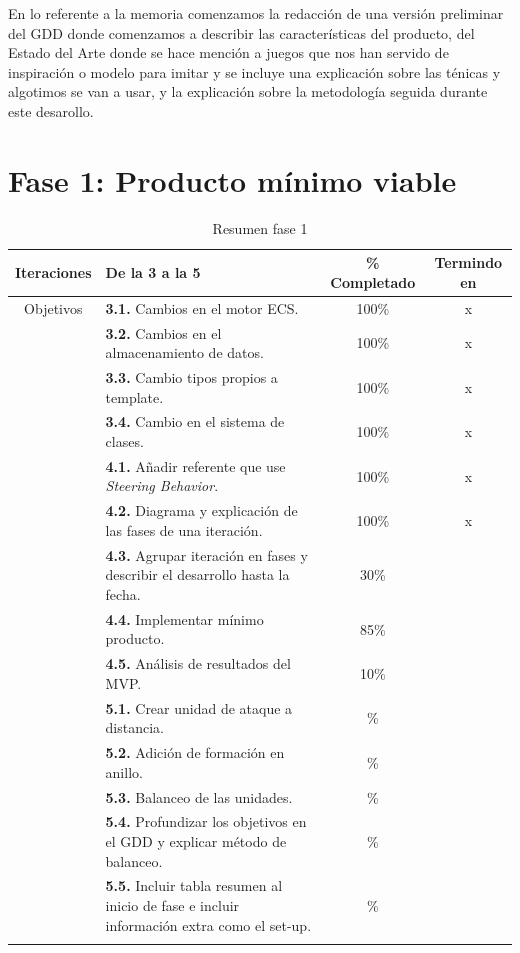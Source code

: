 En lo referente a la memoria comenzamos la redacción de una versión preliminar del \ac{GDD}
donde comenzamos a describir las características del producto, del Estado del Arte donde se hace
mención a juegos que nos han servido de inspiración o modelo para imitar y se incluye una explicación
sobre las ténicas y algotimos se van a usar, y la explicación sobre la metodología seguida durante
este desarollo. 

\newpage

\section{Fase 1: Producto mínimo viable}

\begin{longtable}[c]{|c|p{7cm}|c|c|}
\hline
Iteraciones & De la 3 a la 5                                               & \% Completado & Termindo en \\ 
\hline
Objetivos   &   \textbf{3.1.} Cambios en el motor ECS.                     & 100\% & x \\
	\cmidrule[.006pt]{2-4}
			&   \textbf{3.2.} Cambios en el almacenamiento de datos.       & 100\% & x \\ 
	\cmidrule[.006pt]{2-4}
			&	\textbf{3.3.} Cambio tipos propios a template.             & 100\% & x \\ 
	\cmidrule[.006pt]{2-4}
			&	\textbf{3.4.} Cambio en el sistema de clases.              & 100\% & x \\
\cmidrule[1pt]{2-4}
			&	\textbf{4.1.} Añadir referente que use 
								\textit{Steering Behavior}.                & 100\% & x \\
	\cmidrule[.006pt]{2-4}
			&	\textbf{4.2.} Diagrama y explicación de las fases de 
								una iteración.                             & 100\% & x \\
	\cmidrule[.006pt]{2-4}
			&   \textbf{4.3.} Agrupar iteración en fases y describir el
								desarrollo hasta la fecha.                 & 30\%  &  \\
	\cmidrule[.006pt]{2-4}
			&   \textbf{4.4.} Implementar mínimo producto.                 & 85\%  &  \\
	\cmidrule[.006pt]{2-4}
			&   \textbf{4.5.} Análisis de resultados del MVP.              & 10\%  &  \\
\cmidrule[1.5pt]{2-4}
			&   \textbf{5.1.} Crear unidad de ataque a distancia.          & \% &  \\
	\cmidrule[.006pt]{2-4}
			&   \textbf{5.2.} Adición de formación en anillo.              & \% &  \\ 
	\cmidrule[.006pt]{2-4}
			&	\textbf{5.3.} Balanceo de las unidades.                    & \% &  \\ 
	\cmidrule[.006pt]{2-4}		
			&	\textbf{5.4.} Profundizar los objetivos en el GDD y 
								explicar método de balanceo.               & \% &  \\ 
	\cmidrule[.006pt]{2-4}		
			&	\textbf{5.5.} Incluir tabla resumen al inicio de fase
								e incluir información extra como el set-up.& \% &  \\
\hline
\caption{Resumen fase 1}
\end{longtable}

